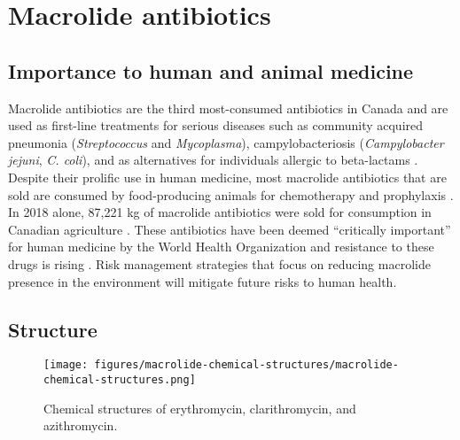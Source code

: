 \section{Macrolide antibiotics}

\subsection{Importance to human and animal medicine}

Macrolide antibiotics are the third most-consumed antibiotics in Canada and are used as first-line treatments for serious diseases such as community acquired pneumonia (\textit{Streptococcus} and \textit{Mycoplasma}), campylobacteriosis (\textit{Campylobacter jejuni}, \textit{C. coli}), and as alternatives for individuals allergic to beta-lactams \parencite{PublicHealthAgencyofCanada.2020, CapeloMartinez.2019}.
Despite their prolific use in human medicine, most macrolide antibiotics that are sold are consumed by food-producing animals for chemotherapy and prophylaxis \parencite{CapeloMartinez.2019}.
In 2018 alone, 87,221 kg of macrolide antibiotics were sold for consumption in Canadian agriculture \parencite{PublicHealthAgencyofCanada.2020}.
These antibiotics have been deemed “critically important” for human medicine by the World Health Organization and resistance to these drugs is rising \parencite{Resistance.2017, PublicHealthAgencyofCanada.2020}.
Risk management strategies that focus on reducing macrolide presence in the environment will mitigate future risks to human health.

\subsection{Structure}

\begin{figure}[htb]
	\centering
		\texttt{[image: figures/macrolide-chemical-structures/macrolide-chemical-structures.png]}
	\caption{Chemical structures of erythromycin, clarithromycin, and azithromycin.}
	\label{fig:macrolide-chemical-structures}
\end{figure}

